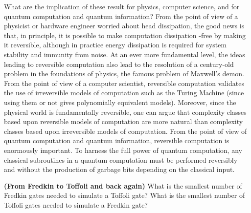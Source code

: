 What are the implication of these result for physics, computer science, and for quantum computation and quantum information? From the point of view of a physicist or hardware engineer worried about head dissipation, the good news is that, in principle, it is possible to make computation dissipation -free by making it reversible, although in practice energy dissipation is required for system stability and immunity from noise. At an ever more fundamental level, the ideas leading to reversible computation also lead to the resolution of a century-old problem in the foundations of physics, the famous problem of Maxwell's demon. From the point of view of a computer scientist, reversible computation validates the use of irreversible models of computation such as the Turing Machine (since using them or not gives polynomially equivalent models). Moreover, since the physical world is fundamentally reversible, one can argue that complexity classes based upon reversible models of computation are more natural than complexity classes based upon irreversible models of computation. From the point of view of quantum computation and quantum information, reversible computation is enormously important. To harness the full power of quantum computation, any classical subroutines in a quantum computation must be performed reversibly and without the production of garbage bits depending on the classical input.

\begin{example}
    \textbf{(From Fredkin to Toffoli and back again)}
    What is the smallest number of Fredkin gates needed to simulate a Toffoli gate? What is the smallest number of Toffoli gates needed to simulate a Fredkin gate?
\end{example}


